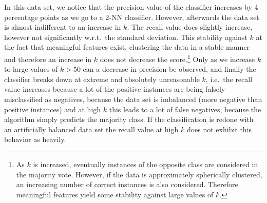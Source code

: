 \documentclass[12pt, a4paper]{scrartcl}
\begin{document}
In this data set, we notice that the precision value of the classifier increases by 4 percentage points as we go to a 2-NN classifier. However, afterwards the data set is almost indifferent to an increase in $k$.  The recall value does slightly increase, however not significantly w.r.t.\ the standard deviation. This stability against $k$ at the fact that meaningful features exist, clustering the data in a stable manner and therefore an increase in $k$ does not decrease the score.\footnote{As $k$ is increased, eventually instances of the opposite class are considered in the majority vote. However, if the data is approximately spherically clustered, an increasing number of correct instances is also considered. Therefore meaningful features yield some stability against large values of $k$.}
Only as we increase $k$ to large values of $k>50$ can a decrease in precision be observed, and finally the classifier breaks down at extreme and absolutely unreasonable $k$, i.e.\  the recall value increases because a lot of the positive instances are being falsely misclassified as negatives, because the data set is imbalanced (more negative than positive instances) and at high $k$ this leads to a lot of false negatives, because the algorithm simply predicts the majority class. If the classification is redone with an artificially balanced data set the recall value at high $k$ does not exhibit this behavior as heavily.
\end{document}
